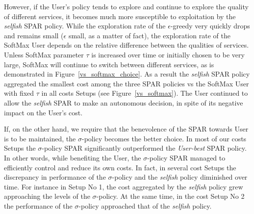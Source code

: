 \documentclass{msdm2012}
\begin{document}
However, if the User's policy tends to explore and continue to explore
the quality of different services, it becomes much more susceptible to
exploitation by the {\em selfish} SPAR policy. While the exploration
rate of the $\epsilon$-greedy very quickly drops and remains small
($\epsilon$ small, as a matter of fact), the exploration rate of the
SoftMax User depends on the relative difference between the qualities
of services. Unless SoftMax parameter $\tau$ is increased over time or
initially chosen to be very large, SoftMax will continue to switch
between different services, as is demonstrated in
Figure~\ref{vs_softmax_choice}. As a result the {\em selfish} SPAR
policy aggregated the smallest cost among the three SPAR policies vs
the SoftMax User with fixed $\tau$ in all costs Setups (see
Figure~\ref{vs_softmax}). The User continued to allow the {\em
  selfish} SPAR to make an autonomous decision, in spite of its
negative impact on the User's cost.

If, on the other hand, we require that the benevolence of the SPAR
towards User is to be maintained, the $\sigma$-policy becomes the
better choice. In most of our costs Setups the $\sigma$-policy SPAR
significantly outperformed the {\em User-best} SPAR policy. In other
words, while benefiting the User, the $\sigma$-policy SPAR managed to
efficiently control and reduce its own costs. In fact, in several cost
Setups the discrepancy in performance of the $\sigma$-policy and the
{\em selfish} policy diminished over time. For instance in Setup No 1,
the cost aggregated by the {\em selfish} policy grew approaching the
levels of the $\sigma$-policy. At the same time, in the cost Setup No
2 the performance of the $\sigma$-policy approached that of the {\em
  selfish} policy.

\end{document}
